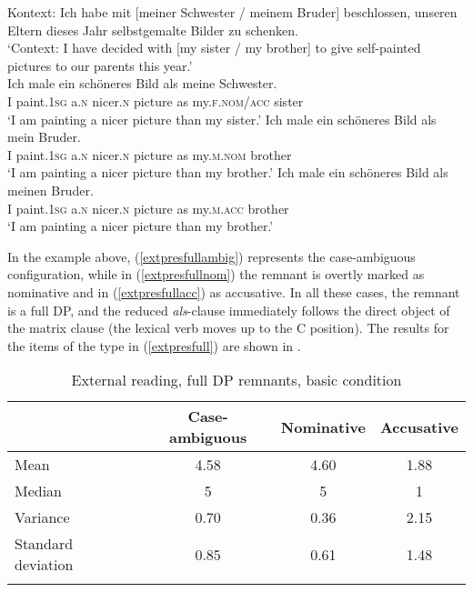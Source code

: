 \ea Kontext: Ich habe mit [meiner Schwester / meinem Bruder] beschlossen, unseren Eltern dieses Jahr selbstgemalte Bilder zu schenken. \label{extpresfull}\\
`Context: I have decided with [my sister / my brother] to give self-painted pictures to our parents this year.'\\
\ea \gll Ich male ein schöneres Bild als meine Schwester. \label{extpresfullambig}\\
I paint.\textsc{1sg} a.\textsc{n} nicer.\textsc{n} picture as my.\textsc{f.nom/acc} sister\\
\glt `I am painting a nicer picture than my sister.'
\ex \gll Ich male ein schöneres Bild als mein Bruder. \label{extpresfullnom}\\
I paint.\textsc{1sg} a.\textsc{n} nicer.\textsc{n} picture as my.\textsc{m.nom} brother\\
\glt `I am painting a nicer picture than my brother.'
\ex \gll Ich male ein schöneres Bild als meinen Bruder. \label{extpresfullacc}\\
I paint.\textsc{1sg} a.\textsc{n} nicer.\textsc{n} picture as my.\textsc{m.acc} brother\\
\glt `I am painting a nicer picture than my brother.'
\z
\z

\begin{sloppypar}
In the example above, (\ref{extpresfullambig}) represents the case-ambiguous configuration, while in (\ref{extpresfullnom}) the remnant is overtly marked as nominative and in (\ref{extpresfullacc}) as accusative. In all these cases, the remnant is a full DP, and the reduced \textit{als}-clause immediately follows the direct object of the matrix clause (the lexical verb moves up to the C position). The results for the items of the type in (\ref{extpresfull}) are shown in .
\end{sloppypar}

\begin{table}
\begin{tabular}{l *3{S[table-format=1.2]}}
\lsptoprule
{} & {Case-ambiguous} & {Nominative} & {Accusative}\\\midrule
Mean & 4.58 & 4.60 & 1.88\\
Median & 5 & 5 & 1\\
Variance & 0.70 & 0.36 & 2.15\\
Standard deviation & 0.85 & 0.61 & 1.48\\
\lspbottomrule
\end{tabular}
\caption{External reading, full DP remnants, basic condition}
\label{tableextpresfull}
\end{table}

